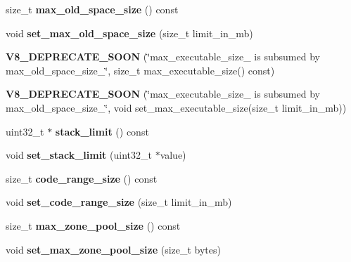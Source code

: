 \begin{DoxyCompactItemize}
size\+\_\+t {\bfseries max\+\_\+old\+\_\+space\+\_\+size} () const
\item 
\mbox{\label{classv8_1_1ResourceConstraints_a3b65a4726a6374b6e206c5ead95dfca4}} 
void {\bfseries set\+\_\+max\+\_\+old\+\_\+space\+\_\+size} (size\+\_\+t limit\+\_\+in\+\_\+mb)
\item 
\mbox{\label{classv8_1_1ResourceConstraints_ac6d9d402595cb4ed096fcf8ace32e27b}} 
{\bfseries V8\+\_\+\+D\+E\+P\+R\+E\+C\+A\+T\+E\+\_\+\+S\+O\+ON} (\char`\"{}max\+\_\+executable\+\_\+size\+\_\+ is subsumed by max\+\_\+old\+\_\+space\+\_\+size\+\_\+\char`\"{}, size\+\_\+t max\+\_\+executable\+\_\+size() const)
\item 
\mbox{\label{classv8_1_1ResourceConstraints_ab05d877a81d3dfa5b52e631a66829413}} 
{\bfseries V8\+\_\+\+D\+E\+P\+R\+E\+C\+A\+T\+E\+\_\+\+S\+O\+ON} (\char`\"{}max\+\_\+executable\+\_\+size\+\_\+ is subsumed by max\+\_\+old\+\_\+space\+\_\+size\+\_\+\char`\"{}, void set\+\_\+max\+\_\+executable\+\_\+size(size\+\_\+t limit\+\_\+in\+\_\+mb))
\item 
\mbox{\label{classv8_1_1ResourceConstraints_ac65767ca8638b69206a7a8f3651641f2}} 
uint32\+\_\+t $\ast$ {\bfseries stack\+\_\+limit} () const
\item 
\mbox{\label{classv8_1_1ResourceConstraints_a26ed3e89985a4afe34e84509fb093cf1}} 
void {\bfseries set\+\_\+stack\+\_\+limit} (uint32\+\_\+t $\ast$value)
\item 
\mbox{\label{classv8_1_1ResourceConstraints_ad97a22955d12a30c9e1634c58a06bb00}} 
size\+\_\+t {\bfseries code\+\_\+range\+\_\+size} () const
\item 
\mbox{\label{classv8_1_1ResourceConstraints_adeab824b969292881098b66164ab9e13}} 
void {\bfseries set\+\_\+code\+\_\+range\+\_\+size} (size\+\_\+t limit\+\_\+in\+\_\+mb)
\item 
\mbox{\label{classv8_1_1ResourceConstraints_ae8506ba44debf9d857bc10e72c4031a4}} 
size\+\_\+t {\bfseries max\+\_\+zone\+\_\+pool\+\_\+size} () const
\item 
\mbox{\label{classv8_1_1ResourceConstraints_a1d32bdb9913fe3b35fba04ddc408d922}} 
void {\bfseries set\+\_\+max\+\_\+zone\+\_\+pool\+\_\+size} (size\+\_\+t bytes)
\end{DoxyCompactItemize}


